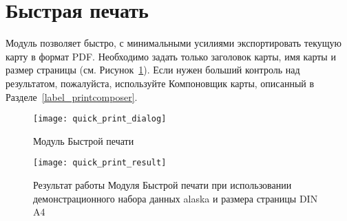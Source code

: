 
\section{Быстрая печать}\label{quickprint}


Модуль  позволяет быстро, с
минимальными усилиями экспортировать текущую карту в формат PDF. Необходимо
задать только заголовок карты, имя карты и размер страницы
(см. Рисунок~\ref{fig:quickprint}). Если нужен больший контроль над
результатом, пожалуйста, используйте Компоновщик карты, описанный в
Разделе~\ref{label_printcomposer}.

\begin{figure}[ht]
   \centering
   \texttt{[image: quick\_print\_dialog]}
   \caption{Модуль Быстрой печати \nixcaption}\label{fig:quickprint}
\end{figure}

\begin{figure}[ht]
   \centering
   \texttt{[image: quick\_print\_result]}
   \caption{Результат работы Модуля Быстрой печати при использовании демонстрационного
   набора данных alaska и размера страницы DIN A4 \nixcaption}\label{fig:quickprint_result}
\end{figure}

\FloatBarrier
